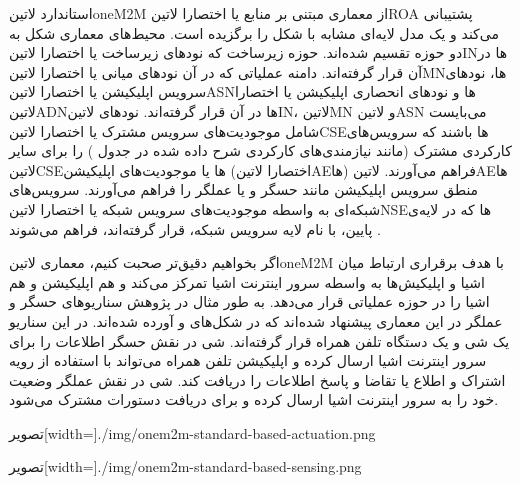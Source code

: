 استاندارد ‌لاتین{oneM2M} از معماری مبتنی بر منابع یا اختصارا ‌لاتین{ROA} پشتیبانی می‌کند و یک مدل لایه‌ای مشابه با شکل  را برگزیده است.
محیط‌های معماری شکل  به دو حوزه تقسیم شده‌اند. حوزه زیرساخت که نودهای زیرساخت یا اختصارا ‌لاتین{IN}ها در آن قرار گرفته‌اند.
دامنه عملیاتی که در آن نودهای میانی یا اختصارا ‌لاتین{MN}ها، نودهای سرویس اپلیکیشن یا اختصارا ‌لاتین{ASN}ها و نودهای انحصاری اپلیکیشن یا اختصارا ‌لاتین{ADN}ها
در آن قرار گرفته‌اند.
نودهای ‌لاتین{IN}، ‌لاتین{MN} و ‌لاتین{ASN} می‌بایست شامل موجودیت‌های سرویس مشترک یا اختصارا ‌لاتین{CSE}ها باشند که سرویس‌های کارکردی مشترک
(مانند نیازمندی‌های کارکردی شرح داده شده در جدول )
را برای سایر ‌لاتین{CSE}ها یا موجودیت‌های اپلیکیشن (اختصارا ‌لاتین{AE}ها)
فراهم می‌آورند.
‌لاتین{AE}ها منطق سرویس اپلیکیشن مانند حسگر و یا عملگر را فراهم می‌آورند.
سرویس‌های شبکه‌ای به واسطه موجودیت‌های سرویس شبکه یا اختصارا ‌لاتین{NSE}ها که در لایه‌ی پایین، با نام لایه سرویس شبکه، قرار گرفته‌اند، فراهم می‌شوند
.

اگر بخواهیم دقیق‌تر صحبت کنیم، معماری ‌لاتین{oneM2M} با هدف برقراری ارتباط میان اشیا و اپلیکیش‌ها به واسطه سرور اینترنت اشیا تمرکز می‌کند و هم اپلیکیشن و هم
اشیا را در حوزه عملیاتی قرار می‌دهد. به طور مثال در پژوهش  سناریوهای حسگر و عملگر در این معماری پیشنهاد شده‌اند که در شکل‌های
 و 
آورده شده‌اند. در این سناریو یک شی و یک دستگاه تلفن همراه قرار گرفته‌اند. شی در نقش حسگر اطلاعات را برای سرور اینترنت اشیا ارسال کرده و اپلیکیشن تلفن همراه می‌تواند
با استفاده از رویه اشتراک و اطلاع یا تقاضا و پاسخ اطلاعات را دریافت کند. شی در نقش عملگر وضعیت خود را به سرور اینترنت اشیا ارسال کرده و برای دریافت دستورات مشترک
می‌شود.

‌تصویر[width=\textwidth]{./img/onem2m-standard-based-actuation.png}

‌تصویر[width=\textwidth]{./img/onem2m-standard-based-sensing.png}

